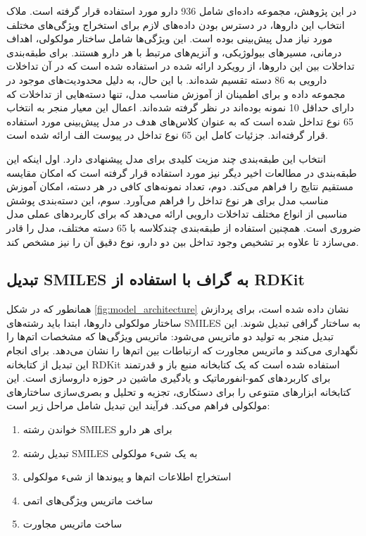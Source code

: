 در این پژوهش، مجموعه داده‌ای شامل 936 دارو مورد استفاده قرار گرفته است. ملاک انتخاب این داروها، در دسترس بودن داده‌های لازم برای استخراج ویژگی‌های مختلف مورد نیاز مدل پیش‌بینی بوده است. این ویژگی‌ها شامل ساختار مولکولی، اهداف درمانی، مسیرهای بیولوژیکی، و آنزیم‌های مرتبط با هر دارو هستند. برای طبقه‌بندی تداخلات بین این داروها، از رویکرد ارائه شده در \cite{ref_ryu2018} استفاده شده است که در آن تداخلات دارویی به 86 دسته تقسیم شده‌اند. با این حال، به دلیل محدودیت‌های موجود در مجموعه داده و برای اطمینان از آموزش مناسب مدل، تنها دسته‌هایی از تداخلات که دارای حداقل 10 نمونه بوده‌اند در نظر گرفته شده‌اند. اعمال این معیار منجر به انتخاب 65 نوع تداخل شده است که به عنوان کلاس‌های هدف در مدل پیش‌بینی مورد استفاده قرار گرفته‌اند. جزئیات کامل این 65 نوع تداخل در پیوست الف ارائه شده است.

انتخاب این طبقه‌بندی چند مزیت کلیدی برای مدل پیشنهادی دارد. اول اینکه این طبقه‌بندی در مطالعات اخیر دیگر نیز مورد استفاده قرار گرفته است \cite{ref_deng2020, ref_asfand2024} که امکان مقایسه مستقیم نتایج را فراهم می‌کند. دوم، تعداد نمونه‌های کافی در هر دسته، امکان آموزش مناسب مدل برای هر نوع تداخل را فراهم می‌آورد. سوم، این دسته‌بندی پوشش مناسبی از انواع مختلف تداخلات دارویی ارائه می‌دهد که برای کاربردهای عملی مدل ضروری است. همچنین استفاده از طبقه‌بندی چندکلاسه با 65 دسته مختلف، مدل را قادر می‌سازد تا علاوه بر تشخیص وجود تداخل بین دو دارو، نوع دقیق آن را نیز مشخص کند.

\subsection{تبدیل SMILES به گراف با استفاده از RDKit}

همانطور که در شکل \ref{fig:model_architecture} نشان داده شده است، برای پردازش ساختار مولکولی داروها، ابتدا باید رشته‌های SMILES به ساختار گرافی تبدیل شوند. این تبدیل منجر به تولید دو ماتریس می‌شود: ماتریس ویژگی‌ها که مشخصات اتم‌ها را نگهداری می‌کند و ماتریس مجاورت که ارتباطات بین اتم‌ها را نشان می‌دهد. برای انجام این تبدیل از کتابخانه RDKit \cite{ref_rdkit} استفاده شده است که یک کتابخانه منبع باز و قدرتمند برای کاربردهای کمو-انفورماتیک و یادگیری ماشین در حوزه داروسازی است. این کتابخانه ابزارهای متنوعی را برای دستکاری، تجزیه و تحلیل و بصری‌سازی ساختارهای مولکولی فراهم می‌کند. فرآیند این تبدیل شامل مراحل زیر است:

\begin{enumerate}
	\item خواندن رشته SMILES برای هر دارو
	\item تبدیل رشته SMILES به یک شیء مولکولی
	\item استخراج اطلاعات اتم‌ها و پیوندها از شیء مولکولی
	\item ساخت ماتریس ویژگی‌های اتمی
	\item ساخت ماتریس مجاورت
\end{enumerate}

